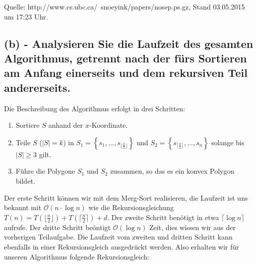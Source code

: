 \documentclass[a4paper]{article}
\begin{document}
Quelle: http://www.cs.ubc.ca/~snoeyink/papers/nosep.ps.gz, Stand 03.05.2015 um 17:23 Uhr. 

\subsection*{(b) - Analysieren Sie die Laufzeit des gesamten Algorithmus, getrennt nach der fürs Sortieren am Anfang einerseits und dem rekursiven Teil andererseits. }

Die Beschreibung des Algorithmus erfolgt in drei Schritten:

\begin{enumerate}

\item Sortiere $S$ anhand der $x$-Koordinate.

\item Teile $S$ ($|S| = k$) in $S_1 = \left\{s_1, ..., s_{\lfloor \frac{k}{2} \rfloor } \right\}$ und $S_2 = \left\{s_{ \lceil \frac{k}{2} \rceil}, ..., s_n \right\}$ solange bis $|S| \geq 3$ gilt.

\item Führe die Polygone $S_1$ und $S_2$ zusammen, so das es ein konvex Polygon bildet.

\end{enumerate}

Der erste Schritt können wir mit dem Merg-Sort realisieren, die Laufzeit ist uns bekannt mit $\mathcal{O}(n \cdot \log n)$ wie die Rekursionsgleichung $T(n) = T(\lfloor \frac{n}{2} \rfloor) + T(\lceil \frac{n}{2} \rceil) + d$.
Der zweite Schritt benötigt in etwa $\lceil \log n \rceil$ aufrufe. Der dritte Schritt beöntigt $\mathcal{O}(\log n)$ Zeit, dies wissen wir aus der vorherigen Teilaufgabe. Die Laufzeit vom zweiten und dritten Schritt kann ebenfalls in einer Rekursionsgleich ausgedrückt werden. Also erhalten wir für unseren Algorithmus folgende Rekursionsgleich:
\end{document}
